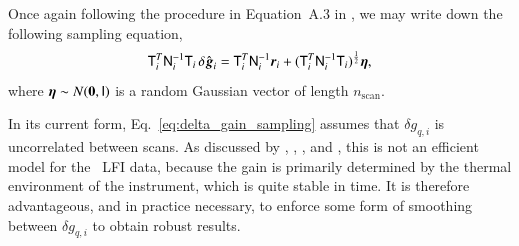 \documentclass[twocolumn]{aa}
\newcommand{\T}[0]{\tens{T}}
\newcommand{\g}[0]{\vec{g}}
\newcommand{\N}[0]{\tens{N}}
\renewcommand{\r}[0]{\vec{r}}
\newcommand{\qi}[0]{_{q, i}}
\begin{document}
Once again following the procedure in Equation~A.3 in \citet{bp01}, we
may write down the following sampling equation,
\begin{equation}
    \T_i^T\N_i^{-1}\T_i\,\delta \hat{\g}_i = \T_i^T\N_i^{-1}\r_i + (\T_i^T\N_i^{-1}\T_i)^{\frac{1}{2}}\vec\eta,
    \label{eq:delta_gain_sampling}
\end{equation}
where $\boldsymbol{\eta}\sim N(\boldsymbol{0},\mathsf{I})$ is a random Gaussian vector of length
$n_{\mathrm{scan}}$.

In its current form, Eq.~\eqref{eq:delta_gain_sampling} assumes that
$\delta g\qi$ is uncorrelated between scans. As discussed by
\citet{planck2013-p03f}, \citet{planck2014-a09}, \citet{planck2016-l03}, and \citet{planck2020-LVII}, this is
not an efficient model for the \Planck\ LFI data, because the gain is
primarily determined by the thermal environment of the instrument, which is
quite stable in time. It is therefore advantageous, and in practice necessary,
to enforce some form of smoothing between $\delta g\qi$ to obtain robust
results.
\end{document}
